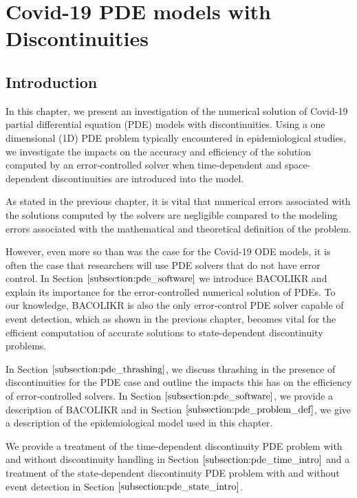 \documentclass{article}
\begin{document}
\section{Covid-19 PDE models with Discontinuities}
\subsection{Introduction}
\label{subsection:pde_intro}
In this chapter, we present an investigation of the numerical solution of Covid-19 partial differential equation (PDE) models with discontinuities. Using a one dimensional (1D) PDE problem typically encountered in epidemiological studies, we investigate the impacts on the accuracy and efficiency of the solution computed by an error-controlled solver when time-dependent and space-dependent discontinuities are introduced into the model.

As stated in the previous chapter, it is vital that numerical errors associated with the solutions computed by the solvers are negligible compared to the modeling errors associated with the mathematical and theoretical definition of the problem.

However, even more so than was the case for the Covid-19 ODE models, it is often the case that researchers will use PDE solvers that do not have error control. In Section $\ref{subsection:pde_software}$ we introduce BACOLIKR and explain its importance for the error-controlled numerical solution of PDEs. To our knowledge, BACOLIKR is also the only error-control PDE solver capable of event detection, which as shown in the previous chapter, becomes vital for the efficient computation of accurate solutions to state-dependent discontinuity problems.

In Section $\ref{subsection:pde_thrashing}$, we discuss thrashing in the presence of discontinuities for the PDE case and outline the impacts this has on the efficiency of error-controlled solvers. In Section $\ref{subsection:pde_software}$, we provide a description of BACOLIKR and in Section $\ref{subsection:pde_problem_def}$, we give a description of the epidemiological model used in this chapter.

We provide a treatment of the time-dependent discontinuity PDE problem with and without discontinuity handling in Section $\ref{subsection:pde_time_intro}$ and a treatment of the state-dependent discontinuity PDE problem with and without event detection in Section $\ref{subsection:pde_state_intro}$.
\end{document}
